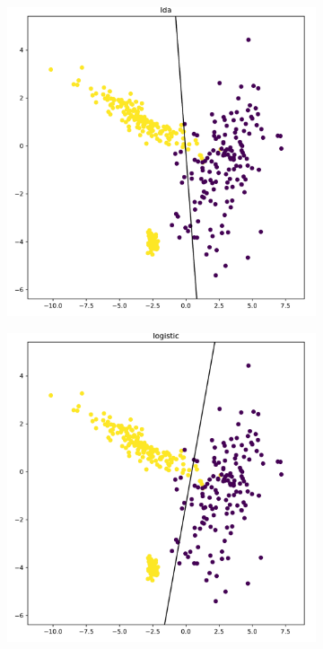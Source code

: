 \documentclass[9pt, oneside]{amsart}   	%
\begin{document}
\clearpage
\begin{figure}[t!]
\centering
\begin{subfigure}{.45\textwidth}
  \centering
  \includegraphics[width=\linewidth]{classificationC_lda.pdf}
\end{subfigure} \hspace{5pt}
\begin{subfigure}{.45\textwidth}
  \centering
  \includegraphics[width=\linewidth]{classificationC_logistic.pdf}

\end{subfigure}
\end{figure}
\end{document}
